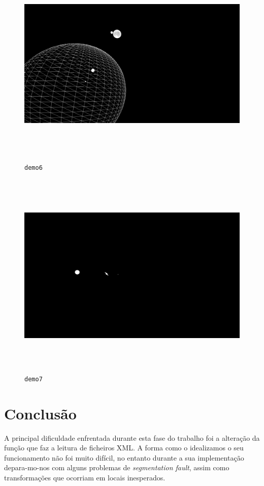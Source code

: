 \documentclass[11pt,a4paper]{report}
\begin{document}
\begin{figure}[H]
\centering
\includegraphics[width = 15cm,height = 10cm]{6.png}
\caption{\texttt{demo6}}
\label{fig:demo6}
\end{figure}

\begin{figure}[H]
\centering
\includegraphics[width = 15cm,height = 10cm]{7.png}
\caption{\texttt{demo7}}
\label{fig:demo7}
\end{figure}



\newpage
\chapter{Conclusão}
A principal dificuldade enfrentada durante esta fase do trabalho foi a alteração da função que faz a leitura de ficheiros XML. A forma como o idealizamos o seu funcionamento não foi muito difícil, no entanto durante a sua implementação depara-mo-nos com alguns problemas de \textit{segmentation fault}, assim como transformações que ocorriam em locais inesperados. 
\end{document}
